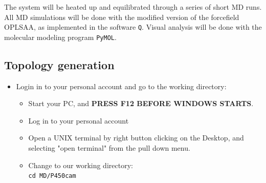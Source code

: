 \documentclass[a4paper,12pt]{article}
\newcommand{\subsctn}[1]{\subsection{#1}}
\newcommand{\q}{\texttt{Q}}
\newcommand{\pymol}{\texttt{PyMOL}}
\begin{document}
The system will be heated up and equilibrated through a series of
short MD runs. All MD simulations will be done with the modified
version of the forcefield OPLSAA, as implemented in the software
{\q}. Visual analysis will be done with the molecular modeling
program {\pymol}.

%
%
%
%
\subsctn {Topology generation}
\begin {itemize}
\item Login in to your personal account and go to the working directory:
    \begin {itemize}
    \item Start your PC, and {\bf PRESS F12 BEFORE WINDOWS STARTS}.
    \item Log in to your personal account
    \item Open a UNIX terminal by right button clicking on the Desktop, and selecting "open terminal" from the pull down menu.
    \item Change to our working directory:\\
    \texttt{cd MD/P450cam}\\
    \end {itemize}



\end{itemize}
\end{document}

